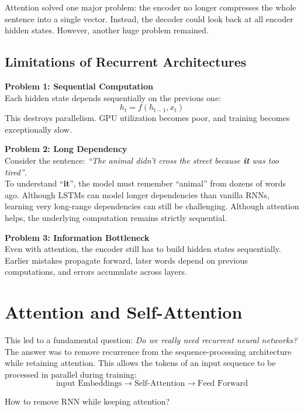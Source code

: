 Attention solved one major problem: the encoder no longer compresses the whole sentence into a single vector. Instead, the decoder could look back at all encoder hidden states. However, another huge problem remained.

\subsection{Limitations of Recurrent Architectures}
\textbf{Problem 1: Sequential Computation} \\
Each hidden state depends sequentially on the previous one:
\begin{equation}
h_t = f(h_{t-1}, x_t)
\end{equation}
This destroys parallelism. GPU utilization becomes poor, and training becomes exceptionally slow.

\textbf{Problem 2: Long Dependency} \\
Consider the sentence: \textit{“The animal didn't cross the street because \textbf{it} was too tired”}. \\
To understand “\textbf{it}”, the model must remember “animal” from dozens of words ago. Although LSTMs can model longer dependencies than vanilla RNNs, learning very long-range dependencies can still be challenging. Although attention helps, the underlying computation remains strictly sequential.

\textbf{Problem 3: Information Bottleneck} \\
Even with attention, the encoder still has to build hidden states sequentially. Earlier mistakes propagate forward, later words depend on previous computations, and errors accumulate across layers.

\section{Attention and Self-Attention}
This led to a fundamental question: \textit{Do we really need recurrent neural networks?} \\
The answer was to remove recurrence from the sequence-processing architecture while retaining attention. This allows the tokens of an input sequence to be processed in parallel during training:
\begin{equation*}
\text{input Embeddings} \longrightarrow \text{Self-Attention} \longrightarrow \text{Feed Forward}
\end{equation*}

How to remove RNN while keeping attention?

